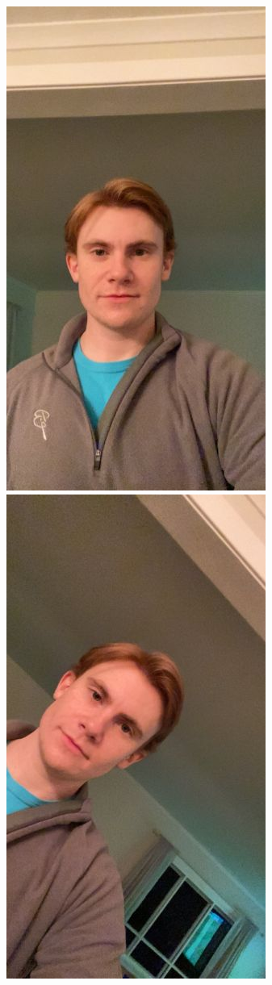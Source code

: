 \begin{figure}[h]
\centering
    \subfloat
        {\includegraphics[scale = 0.13]{figures/0035.jpg}\hspace{0.4cm}}
    \subfloat
        {\includegraphics[scale = 0.13]{figures/0143.jpg}\hspace{0.4cm}}

\end{figure}
